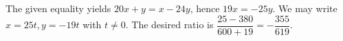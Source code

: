 The given equality yields $20x+y=x-24y$, hence $19x=-25y$. We may write $x=25t,y=-19t$ with $t\ne0$. The desired ratio is $\dfrac{25-380}{600+19}=\boxed{-\dfrac{355}{619}}$.
